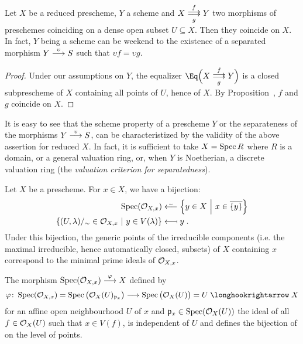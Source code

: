 \documentclass[a4paper,parskip=half,numbers=enddot, DIV=12]{scrreprt}
\begin{document}
\begin{fact}
    Let $X$ be a reduced prescheme, $Y$ a scheme and $X\doublemorphism[f][g] Y$ two morphisms of preschemes coinciding on a dense open subset $U\subseteq X$. Then they coincide on $X$. In fact, $Y$ being a scheme can be weekend to the existence of a separated morphism $Y\morphism[\upsilon] S$ such that $\upsilon f = \upsilon g$.
\end{fact}
\begin{proof}
    Under our assumptions on $Y$, the equalizer $\Eq\Big(X\doublemorphism[f][g] Y\Big)$ is a closed subprescheme of $X$ containing all points of $U$, hence of $X$. By Proposition~, $f$ and $g$ coincide on $X$.
\end{proof}
\begin{rem}
    It is easy to see that the scheme property of a prescheme $Y$ or the separateness of the morphisms $Y\morphism[\upsilon] S$, can be characteristized by the validity of the above assertion for reduced $X$. In fact, it is sufficient to take $X=\operatorname{Spec} R$ where $R$ is a domain, or a general valuation ring, or, when $Y$ is Noetherian, a discrete valuation ring (the \emph{valuation criterion for separatedness}).
\end{rem}
\begin{prop}
    \begin{alphanumerate}
    \item{}
        Let $X$ be a prescheme. For $x\in X$, we have a bijection:
        \begin{align*}
            \Spec(\Oo_{X,x}) &\lisomorphism \left\{y\in X\st x\in \ov{\{y\}}\right\}\\
            \left\{(U,\lambda)/_\sim \in \Oo_{X,x}\st y\in V(\lambda)\right\} &\longmapsfrom y\;.
        \end{align*}
        Under this bijection, the generic points of the irreducible components (i.e. the maximal irreducible, hence automatically closed, subsets) of $X$ containing $x$ correspond to the minimal prime ideals of $\mathcal{O}_{X,x}$.
    \item
        The morphism $\Spec (\Oo_{X,x}) \morphism[\phi] X$ defined by 
        \begin{align*}
            \phi\colon\Spec(\Oo_{X,x} ) = \Spec\big(\Oo_X(U)_{\pp_x}\big) \morphism \Spec\big(\Oo_X(U)\big) = U \monomorphism X
        \end{align*}
        for an affine open neighbourhood $U$ of $x$ and $\mathfrak{p}_x\in \operatorname{Spec}(\mathcal{O}_X(U))$ the ideal of all $f\in \mathcal{O}_X(U)$ such that $x\in V(f)$, is independent of $U$ and defines the bijection of  on the level of points.
    \end{alphanumerate}
\end{prop}
\end{document}
